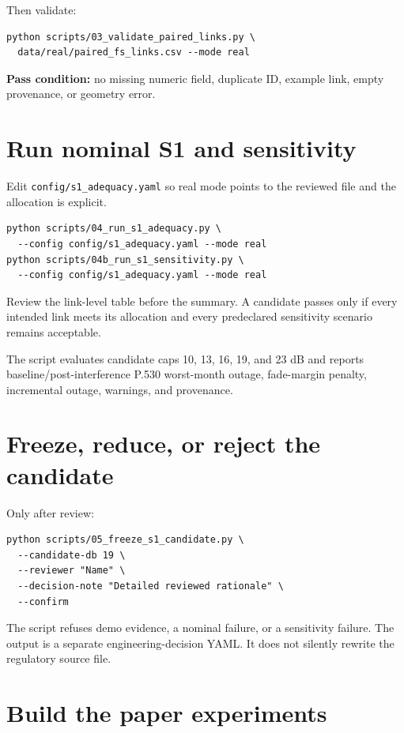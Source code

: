 \documentclass[11pt]{article}
\begin{document}
Then validate:
\begin{verbatim}
python scripts/03_validate_paired_links.py \
  data/real/paired_fs_links.csv --mode real
\end{verbatim}

\textbf{Pass condition:} no missing numeric field, duplicate ID, example link, empty provenance, or geometry error.

\section{Run nominal S1 and sensitivity}

Edit \texttt{config/s1\_adequacy.yaml} so real mode points to the reviewed file and the allocation is explicit.

\begin{verbatim}
python scripts/04_run_s1_adequacy.py \
  --config config/s1_adequacy.yaml --mode real
python scripts/04b_run_s1_sensitivity.py \
  --config config/s1_adequacy.yaml --mode real
\end{verbatim}

Review the link-level table before the summary. A candidate passes only if every intended link meets its allocation and every predeclared sensitivity scenario remains acceptable.

The script evaluates candidate caps 10, 13, 16, 19, and 23 dB and reports baseline/post-interference P.530 worst-month outage, fade-margin penalty, incremental outage, warnings, and provenance.

\section{Freeze, reduce, or reject the candidate}

Only after review:
\begin{verbatim}
python scripts/05_freeze_s1_candidate.py \
  --candidate-db 19 \
  --reviewer "Name" \
  --decision-note "Detailed reviewed rationale" \
  --confirm
\end{verbatim}

The script refuses demo evidence, a nominal failure, or a sensitivity failure. The output is a separate engineering-decision YAML. It does not silently rewrite the regulatory source file.

\section{Build the paper experiments}
\end{document}
